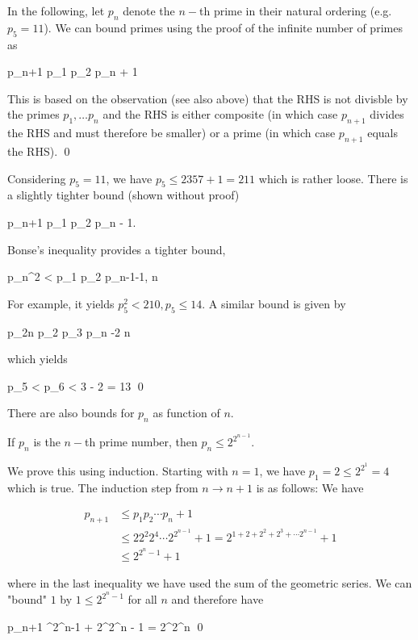 In the following, let $p_n$ denote the $n-$th prime in their natural ordering (e.g. $p_5 = 11$). We can bound primes using the proof of the infinite number of primes as

\bee
p_{n+1} \leq p_1 p_2 \cdots p_n + 1
\eee

This is based on the observation (see also above) that the RHS is not divisble by the primes $p_1, \ldots p_n$ and the RHS is either composite (in which case $p_{n+1}$ divides the RHS and must therefore be smaller) or a prime (in which case $p_{n+1}$ equals the RHS). \qed

Considering $p_5 = 11$, we have $p_5 \leq 2 3 5 7 + 1 = 211$ which is rather loose. There is a slightly tighter bound (shown without proof)

\bee
p_{n+1} \leq p_1 p_2 \cdots p_n - 1. 
\eee

Bonse's inequality provides a tighter bound, 

\bee
p_n^2  < p_1 p_2 \cdots p_{n-1}-1, \quad n 
\eee

For example, it yields $p_5^2 < 210, p_5 \leq 14$. A similar bound is given by

\bee
p_{2n} \leq p_2 p_3 \cdots p_n -2 \quad n 
\eee

which yields

\bee
p_5 < p_6 < 3  - 2 = 13 \qed
\eee

There are also bounds for $p_n$ as function of $n$.

\begin{theorem}
    If $p_n$ is the $n-$th prime number, then $p_n \leq 2^{2^{n-1}}$.
\end{theorem}

We prove this using induction. Starting with $n=1$, we have $p_1 = 2 \leq 2^{2^{1}} = 4$ which is true. The induction step from $n \rightarrow n+1$ is as follows: We have

\begin{align*}
p_{n+1} & \leq p_1 p_2 \cdots p_n + 1 \\
        & \leq 2 2^2 2^4 \cdots 2^{2^{n-1}} + 1 = 2^{1 + 2 + 2^2 + 2^3 + \cdots 2^{n-1}} + 1 \\ 
        & \leq 2^{2^{n}-1} + 1
\end{align*}

where in the last inequality we have used the sum of the geometric series. We can "bound" $1$ by $1 \leq 2^{2^{n} - 1}$ for all $n$ and therefore have

\bee
p_{n+1} ^{2^{n}-1} + 2^{2^{n} - 1} = 2^{2^{n}} \qed
\eee

